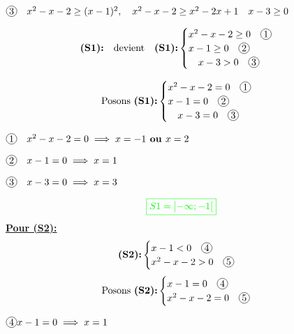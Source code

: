 \documentclass[12pt,a4paper]{article}
\begin{document}
\begin{enumerate}
\begin{enumerate}
\(
\encercle{3}\quad x^2 - x - 2 \geq (x-1)^2 , \\
\quad x^2 - x - 2 \geq x^{2}-2x+1\\
\quad x - 3 \geq 0
\)


\[\textbf{(S1):} \quad \text{devient} \quad \textbf{(S1):}
\begin{cases}
x^2 - x - 2 \geq 0  \quad \encercle{1}\\
x - 1 \geq 0  \quad \encercle{2}\\
\quad x - 3 > 0 \quad \encercle{3}
\end{cases}
\]

\[\text{Posons }\textbf{(S1):}
\begin{cases}
x^2 - x - 2 = 0  \quad \encercle{1}\\
x - 1  = 0 \quad \encercle{2}\\
\quad x - 3 = 0 \quad \encercle{3}
\end{cases}
\]

\(\encercle{1} \quad x^2 - x - 2 = 0 \implies x=-1 \textbf{ ou } x=2\)

\(\encercle{2} \quad x - 1 = 0 \implies x=1 \)

\(\encercle{3} \quad x - 3 = 0 \implies x=3 \)
\begin{flushleft}
\end{flushleft}
\[
\textcolor{green}{\boxed{S1 = \left]-\infty ; -1\right[  }} 
\]
\underline{\textbf{Pour (S2):}}
\[
\textbf{(S2):}\begin{cases}
x - 1 < 0 \quad \encercle{4} \\
x^2 - x - 2 > 0 \quad \encercle{5}
\end{cases}
\]
\[\text{Posons }\textbf{(S2):}
\begin{cases}
x - 1 = 0 \quad \encercle{4} \\
x^2 - x - 2 = 0 \quad \encercle{5}
\end{cases}
\]

\( \encercle{4} x - 1 = 0 \implies x=1\)


\end{enumerate}
\end{enumerate}
\end{document}
